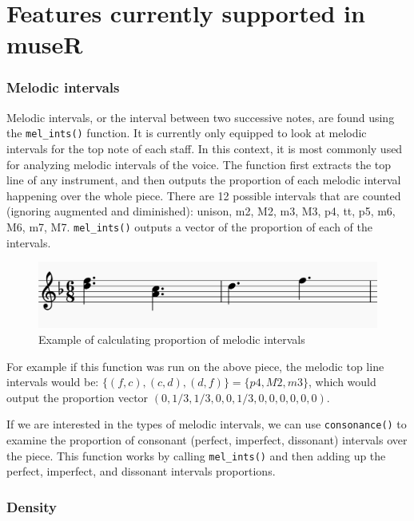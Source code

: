 \documentclass[12pt,twoside]{reedthesis}
\theoremstyle{definition}
\theoremstyle{definition}
\theoremstyle{definition}
\theoremstyle{remark}
\begin{document}
\section{Features currently supported in
museR}\label{features-currently-supported-in-muser}

\subsubsection{Melodic intervals}\label{melodic-intervals}

Melodic intervals, or the interval between two successive notes, are
found using the \texttt{mel\_ints()} function. It is currently only
equipped to look at melodic intervals for the top note of each staff. In
this context, it is most commonly used for analyzing melodic intervals
of the voice. The function first extracts the top line of any
instrument, and then outputs the proportion of each melodic interval
happening over the whole piece. There are 12 possible intervals that are
counted (ignoring augmented and diminished): unison, m2, M2, m3, M3, p4,
tt, p5, m6, M6, m7, M7. \texttt{mel\_ints()} outputs a vector of the
proportion of each of the intervals.
\begin{figure}[h]
\centering
\includegraphics[scale = .5]{images/ex2.png}
\caption{Example of calculating proportion of melodic intervals}
\label{subd}
\end{figure}
For example if this function was run on the above piece, the melodic top
line intervals would be: \(\{(f,c),(c,d),(d,f)\} = \{p4,M2,m3\}\), which
would output the proportion vector \((0,1/3,1/3,0,0,1/3,0,0,0,0,0,0)\).

If we are interested in the types of melodic intervals, we can use
\texttt{consonance()} to examine the proportion of consonant (perfect,
imperfect, dissonant) intervals over the piece. This function works by
calling \texttt{mel\_ints()} and then adding up the perfect, imperfect,
and dissonant intervals proportions.

\subsubsection{Density}\label{density}
\end{document}
